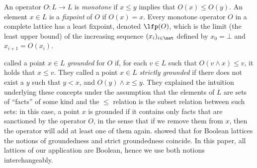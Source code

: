 

An operator $O:L\to L$ is \emph{monotone} if $x\leq y$ implies that $O(x)\leq O(y)$.
An element $x\in L$ is 
a \emph{fixpoint}
of $O$ if
$O(x)=x$.
Every monotone operator $O$ in a %
complete lattice has a least fixpoint, denoted $\lfp(O)$, which is 
the limit (the least upper bound) of the increasing sequence $(x_i)_{i \in \nat}$ defined by $x_0=\bot$ and $x_{i+1} = O(x_i)$. 


 called a point  $x\in L$ \emph{grounded} for $O$ if, for each $v\in L$ such that $O(v\land x)\leq v$, it holds that $x\leq v$. They called a point $x\in L$ \emph{strictly grounded} if there does not exist a $y$ such that $y<x$, and $O(y)\land x \leq y$. 
They explained the intuition underlying these concepts under the assumption that the elements of $L$ are sets of ``facts'' of some kind and the $\leq$ relation is the subset relation between such sets:
in this case, a point $x$ is grounded if it contains only facts that are sanctioned by the operator $O$, 
in the sense that if we remove them from $x$, then the operator will add at least one of them again. 
\citet{phd/Bogaerts15} showed that for Boolean lattices the notions of groundedness and strict groundedness coincide. In this paper, all lattices of our application are Boolean, hence we use both notions interchangeably.

